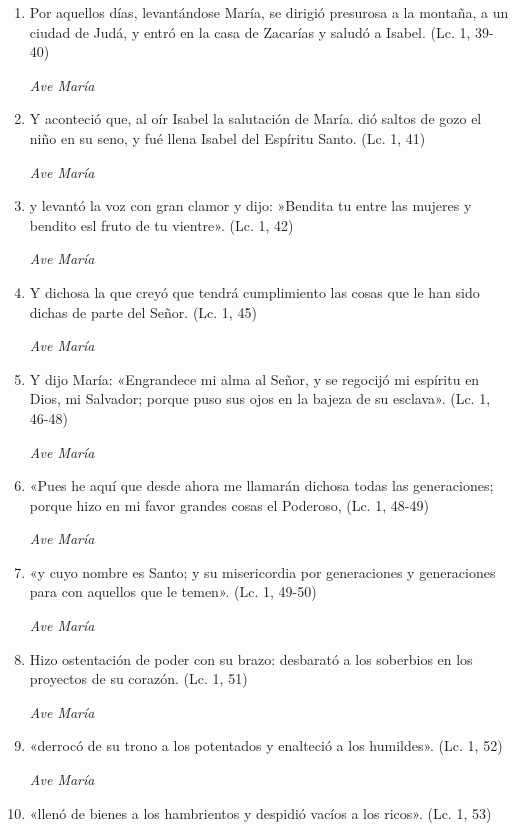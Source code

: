 \documentclass[a4paper,11pt, oneside]{report}
\begin{document}
        \begin{enumerate}
          
          \item Por aquellos días, levantándose María, se dirigió presurosa a la montaña, a un ciudad de Judá, y entró en la casa
          de Zacarías y saludó a Isabel. (Lc. 1, 39-40)
          
          \textit{Ave María}

          \item Y aconteció que, al oír Isabel la salutación de María. dió saltos de gozo el niño en su seno, y fué llena Isabel del Espíritu Santo. (Lc. 1, 41)
          
          \textit{Ave María}

          \item y levantó la voz con gran clamor y dijo: »Bendita tu entre las mujeres y bendito esl fruto de tu vientre». (Lc. 1, 42)
          
          \textit{Ave María}

          \item Y dichosa la que creyó que tendrá cumplimiento las cosas que le han sido dichas de parte del Señor. (Lc. 1, 45)
          
          \textit{Ave María}

          \item Y dijo María: «Engrandece mi alma al Señor, y se regocijó mi espíritu en Dios, mi Salvador;
          porque puso sus ojos en la bajeza de su esclava». (Lc. 1, 46-48)

          \textit{Ave María}

          \item «Pues he aquí que desde ahora me llamarán dichosa todas las generaciones; 
          porque hizo en mi favor grandes cosas el Poderoso, (Lc. 1, 48-49)
          
          \textit{Ave María}

          \item «y cuyo nombre es Santo; y su misericordia por generaciones y generaciones para con aquellos que le temen». (Lc. 1, 49-50)
          
          \textit{Ave María}

          \item Hizo ostentación de poder con su brazo: desbarató a los soberbios en los proyectos de su corazón. (Lc. 1, 51)
          
          \textit{Ave María}

          \item «derrocó de su trono a los potentados y enalteció a los humildes». (Lc. 1, 52)
          
          \textit{Ave María}

          \item «llenó de bienes a los hambrientos y despidió vacíos a los ricos». (Lc. 1, 53)

        \end{enumerate}
\end{document}
